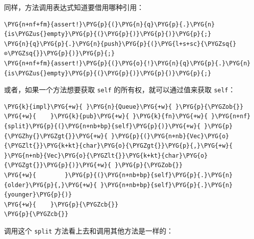 同样，方法调用表达式知道要借用哪种引用：

\begin{Verbatim}[commandchars=\\\{\},breaklines=true,breakanywhere=true,fontsize=\codefont,xleftmargin=17bp]
\PYG{n+nf+fm}{assert!}\PYG{p}{(}\PYG{n}{q}\PYG{p}{.}\PYG{n}{is\PYGZus{}empty}\PYG{p}{(}\PYG{p}{)}\PYG{p}{)}\PYG{p}{;}
\PYG{n}{q}\PYG{p}{.}\PYG{n}{push}\PYG{p}{(}\PYG{l+s+sc}{\PYGZsq{}⊙\PYGZsq{}}\PYG{p}{)}\PYG{p}{;}
\PYG{n+nf+fm}{assert!}\PYG{p}{(}\PYG{o}{!}\PYG{n}{q}\PYG{p}{.}\PYG{n}{is\PYGZus{}empty}\PYG{p}{(}\PYG{p}{)}\PYG{p}{)}\PYG{p}{;}
\end{Verbatim}

或者，如果一个方法想要获取 \texttt{self} 的所有权，就可以通过值来获取 \texttt{self}：

\begin{Verbatim}[commandchars=\\\{\},breaklines=true,breakanywhere=true,fontsize=\codefont,xleftmargin=17bp]
\PYG{k}{impl}\PYG{+w}{ }\PYG{n}{Queue}\PYG{+w}{ }\PYG{p}{\PYGZob{}}
\PYG{+w}{    }\PYG{k}{pub}\PYG{+w}{ }\PYG{k}{fn}\PYG{+w}{ }\PYG{n+nf}{split}\PYG{p}{(}\PYG{n+nb+bp}{self}\PYG{p}{)}\PYG{+w}{ }\PYG{p}{\PYGZhy{}\PYGZgt{}}\PYG{+w}{ }\PYG{p}{(}\PYG{n+nb}{Vec}\PYG{o}{\PYGZlt{}}\PYG{k+kt}{char}\PYG{o}{\PYGZgt{}}\PYG{p}{,}\PYG{+w}{ }\PYG{n+nb}{Vec}\PYG{o}{\PYGZlt{}}\PYG{k+kt}{char}\PYG{o}{\PYGZgt{}}\PYG{p}{)}\PYG{+w}{ }\PYG{p}{\PYGZob{}}
\PYG{+w}{        }\PYG{p}{(}\PYG{n+nb+bp}{self}\PYG{p}{.}\PYG{n}{older}\PYG{p}{,}\PYG{+w}{ }\PYG{n+nb+bp}{self}\PYG{p}{.}\PYG{n}{younger}\PYG{p}{)}
\PYG{+w}{    }\PYG{p}{\PYGZcb{}}
\PYG{p}{\PYGZcb{}}
\end{Verbatim}

调用这个 \texttt{split} 方法看上去和调用其他方法是一样的：

